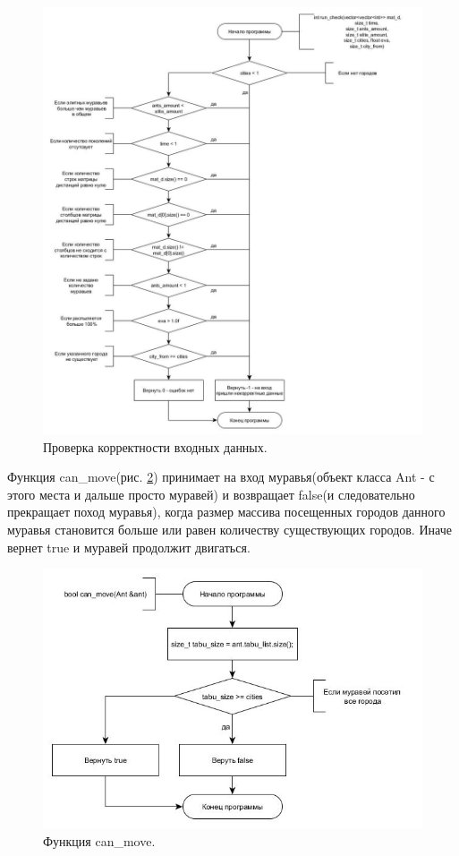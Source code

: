 \documentclass[a4paper, 14pt]{article}
\begin{document}
\begin{figure}[h!]
\center
\includegraphics[scale=0.5]{run_check.jpg}
\caption{Проверка корректности входных данных.}
\label{ris:run_check}
\end{figure}\newpage

Функция can\_move(рис. \ref{ris:can_move}) принимает на вход муравья(объект класса Ant - с этого места и дальше просто муравей) и возвращает false(и следовательно прекращает поход муравья), когда размер массива посещенных городов данного муравья становится больше или равен количеству существующих городов. Иначе вернет true и муравей продолжит двигаться. 

\begin{figure}[h!]
\center
\includegraphics[scale=0.6]{can_move.jpg}
\caption{Функция can\_move.}
\label{ris:can_move}
\end{figure}\newpage
\end{document}
